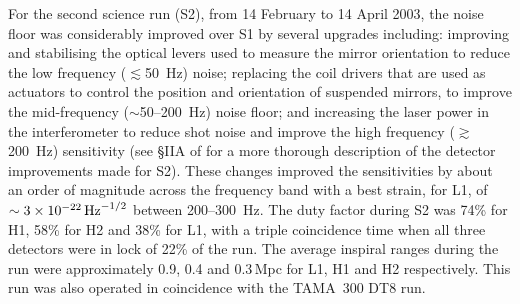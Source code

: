 \documentclass{article}
\begin{document}

For the second science run (S2), from 14 February to 14 April 2003, the noise
floor was considerably improved over S1 by several upgrades including: improving
and stabilising the optical levers used to measure the mirror orientation to
reduce the low frequency ($\lesssim$50~Hz) noise; replacing the coil drivers
that are used as actuators to control the position and orientation of suspended
mirrors, to improve the mid-frequency ($\sim$50--200~Hz) noise floor; and
increasing the laser power in the interferometer to reduce shot noise and
improve the high frequency ($\gtrsim$200~Hz) sensitivity (see \S{}IIA of
\cite{Abbott:2005a} for a more thorough description of the detector improvements
made for S2). These changes improved the sensitivities by about an order of
magnitude across the frequency band with a best strain, for L1, of
$\sim3\times10^{-22}\,{\rm Hz}^{-1/2}$ between 200--300~Hz. The duty factor
during S2 was 74\% for H1, 58\% for H2 and 38\% for L1, with a triple
coincidence time when all three detectors were in lock of 22\% of the run. The
average inspiral ranges during the run were approximately 0.9, 0.4 and 0.3\,Mpc
for L1, H1 and H2 respectively. This run was also operated in coincidence with
the TAMA~300 DT8 run.
\end{document}
